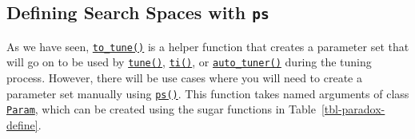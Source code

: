 \hypertarget{sec-tune-ps}{%
\subsection{\texorpdfstring{Defining Search Spaces with
\texttt{ps}}{Defining Search Spaces with ps}}\label{sec-tune-ps}}

As we have seen,
\href{https://paradox.mlr-org.com/reference/to_tune.html}{\texttt{to\_tune()}}
is a helper function that creates a parameter set that will go on to be
used by
\href{https://mlr3tuning.mlr-org.com/reference/tune.html}{\texttt{tune()}},
\href{https://mlr3tuning.mlr-org.com/reference/ti.html}{\texttt{ti()}},
or
\href{https://mlr3tuning.mlr-org.com/reference/auto_tuner.html}{\texttt{auto\_tuner()}}
during the tuning process. However, there will be use cases where you
will need to create a parameter set manually using
\href{https://paradox.mlr-org.com/reference/ps.html}{\texttt{ps()}}.
This function takes named arguments of class
\href{https://paradox.mlr-org.com/reference/Param.html}{\texttt{Param}},
which can be created using the sugar functions in
Table~\ref{tbl-paradox-define}.

